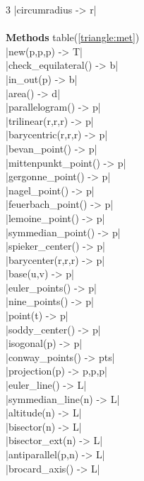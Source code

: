 \documentclass[DIV         = 14,
               fontsize    = 10,
               index       = totoc,
               twoside,
               cadre,
               headings    = small
               ]{tkz-doc}
\begin{document}
\begin{multicols}{3}
|circumradius              -> r|  \\
\\
\textbf{Methods} table(\ref{triangle:met}) \\
|new(p,p,p)                -> T|  \\
|check_equilateral()       -> b|  \\
|in_out(p)                 -> b|  \\
|area()                    -> d|  \\
|parallelogram()           -> p|  \\
|trilinear(r,r,r)          -> p|  \\
|barycentric(r,r,r)        -> p|  \\
|bevan_point()             -> p|  \\
|mittenpunkt_point()       -> p|  \\
|gergonne_point()          -> p|  \\
|nagel_point()             -> p|  \\
|feuerbach_point()         -> p|  \\
|lemoine_point()           -> p|  \\
|symmedian_point()         -> p|  \\
|spieker_center()          -> p|  \\
|barycenter(r,r,r)         -> p|  \\
|base(u,v)                 -> p|  \\
|euler_points()            -> p|  \\
|nine_points()             -> p|  \\
|point(t)                  -> p|  \\
|soddy_center()            -> p|  \\
|isogonal(p)               -> p|   \\
|conway_points()         -> pts|   \\
|projection(p)         -> p,p,p|   \\
|euler_line()              -> L|   \\
|symmedian_line(n)         -> L|   \\
|altitude(n)               -> L|   \\
|bisector(n)               -> L|   \\
|bisector_ext(n)           -> L|   \\
|antiparallel(p,n)         -> L|   \\
|brocard_axis()            -> L|   \\

\end{multicols}
\end{document}
